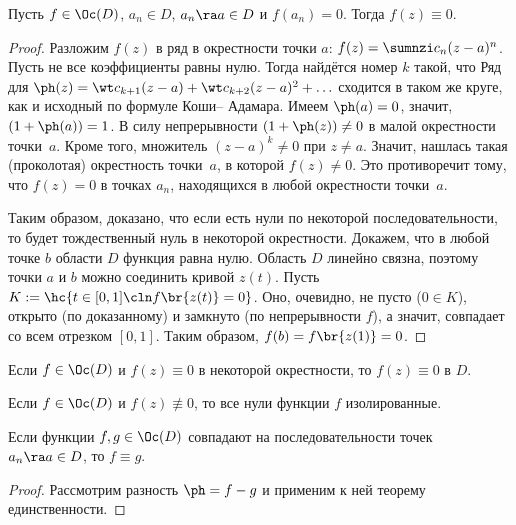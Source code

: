 \documentclass[a4paper]{article}
\begin{document}
\begin{theorem}[единственности]
Пусть $f \in \Oc(D)$, $a_{n} \in D$, $a_n \ra a \in D$ и $f(a_n)=0$. Тогда $f(z) \equiv 0$.
\end{theorem}
\begin{proof}
Разложим $f(z)$ в ряд в окрестности точки $a$: $f(z)=\sumnzi c_n(z-a)^n$.
Пусть не все коэффициенты равны нулю. Тогда найдётся номер $k$ такой, что
Ряд для $\ph(z) = \wt c_{k+1}(z-a) + \wt c_{k+2}(z-a)^2 + \ldots$ сходится в таком же круге, как и исходный
по формуле Коши-- Адамара. Имеем $\ph(a) = 0$, значит, $(1+\ph(a))=1$. В силу непрерывности $(1+\ph(z))\neq 0$ в
малой окрестности точки~$a$. Кроме того, множитель $(z-a)^k \neq 0$ при $z \neq a$.
Значит, нашлась такая (проколотая) окрестность точки~$a$, в которой $f(z) \neq 0$. Это противоречит тому, что
$f(z) = 0$ в точках $a_n$, находящихся в любой окрестности точки~$a$.

Таким образом, доказано, что если есть нули по некоторой последовательности, то будет
тождественный нуль в некоторой окрестности. Докажем, что в любой точке $b$ области $D$ функция
равна нулю. Область $D$ линейно связна, поэтому точки $a$ и $b$ можно соединить кривой $z(t)$.
Пусть $K := \hc{t \in [0,1]\cln f\br{z(t)} = 0}$. Оно, очевидно, не пусто ($0 \in K$), открыто (по доказанному)
и замкнуто (по непрерывности $f$), а значит, совпадает со всем отрезком $[0,1]$. Таким образом, $f(b) = f\br{z(1)} = 0$.
\end{proof}
\begin{imp}
Если $f \in \Oc(D)$ и $f(z)\equiv 0$ в некоторой окрестности, то $f(z)\equiv 0$ в $D$.
\end{imp}
\begin{imp}
Если $f \in \Oc(D)$ и $f(z) \not\equiv 0$, то все нули функции $f$ изолированные.
\end{imp}
\begin{imp}
Если функции $f,g \in \Oc(D)$ совпадают на последовательности точек $a_n \ra a \in D$, то $f \equiv g$.
\end{imp}
\begin{proof}
Рассмотрим разность $\ph=f-g$ и применим к ней теорему единственности.
\end{proof}
\end{document}
